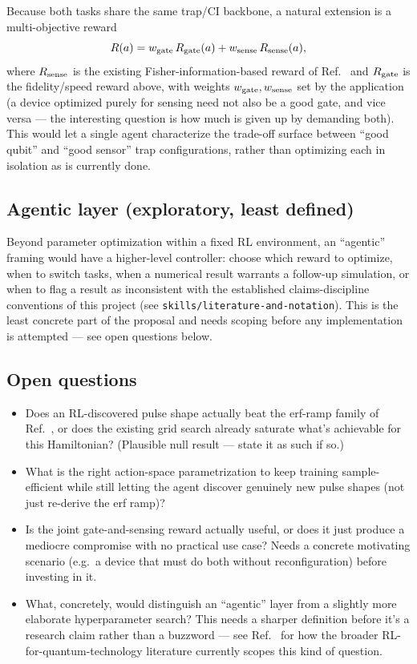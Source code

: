 \documentclass[aps,prapplied,reprint,superscriptaddress,longbibliography]{revtex4-2}
\begin{document}
Because both tasks share the same trap/CI backbone, a natural extension is a multi-objective reward
\begin{equation}
R(a) = w_{\rm gate}\, R_{\rm gate}(a) + w_{\rm sense}\, R_{\rm sense}(a),
\end{equation}
where $R_{\rm sense}$ is the existing Fisher-information-based reward of
Ref.~\cite{perruzza2026} and $R_{\rm gate}$ is the fidelity/speed reward above, with weights
$w_{\rm gate}, w_{\rm sense}$ set by the application (a device optimized purely for sensing need not
also be a good gate, and vice versa — the interesting question is how much is given up by demanding
both). This would let a single agent characterize the trade-off surface between ``good qubit'' and
``good sensor'' trap configurations, rather than optimizing each in isolation as is currently done.

\subsection{Agentic layer (exploratory, least defined)}

Beyond parameter optimization within a fixed RL environment, an ``agentic'' framing would have a
higher-level controller: choose which reward to optimize, when to switch tasks, when a numerical
result warrants a follow-up simulation, or when to flag a result as inconsistent with the
established claims-discipline conventions of this project (see
\texttt{skills/literature-and-notation}). This is the least concrete part of the proposal and
needs scoping before any implementation is attempted — see open questions below.

\subsection{Open questions}

\begin{itemize}
  \item Does an RL-discovered pulse shape actually beat the erf-ramp family of
  Ref.~\cite{leinonen2025}, or does the existing grid search already saturate what's achievable
  for this Hamiltonian? (Plausible null result — state it as such if so.)
  \item What is the right action-space parametrization to keep training sample-efficient while still
  letting the agent discover genuinely new pulse shapes (not just re-derive the erf ramp)?
  \item Is the joint gate-and-sensing reward actually useful, or does it just produce a mediocre
  compromise with no practical use case? Needs a concrete motivating scenario (e.g.\ a device that
  must do both without reconfiguration) before investing in it.
  \item What, concretely, would distinguish an ``agentic'' layer from a slightly more elaborate
  hyperparameter search? This needs a sharper definition before it's a research claim rather than a
  buzzword — see Ref.~\cite{bukov2026reinforcement} for how the broader RL-for-quantum-technology
  literature currently scopes this kind of question.
\end{itemize}
\end{document}
